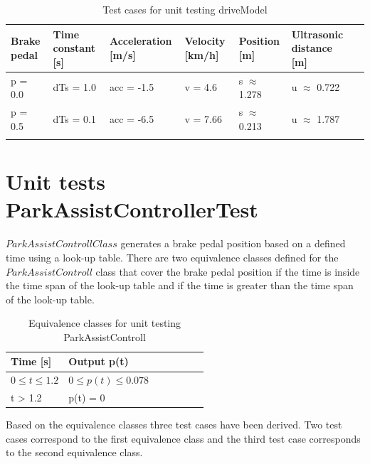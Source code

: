 \begin{table}[H]
\centering
\caption{Test cases for unit testing driveModel}
\begin{adjustbox}{width=1\textwidth, center=\textwidth}
\renewcommand{\arraystretch}{1}
\begin{tabular}{lllllll}
\textbf{Brake pedal} & \textbf{Time constant [s]} & \textbf{Acceleration [m/s]} &\textbf{Velocity [km/h]} & \textbf{Position [m]} & \textbf{Ultrasonic distance [m]} \\\hline
p = 0.0 & dTs = 1.0 & acc = -1.5 & v = 4.6 & s $\approx$ 1.278 & u $\approx$ 0.722\\
p = 0.5 & dTs = 0.1 & acc = -6.5 & v = 7.66 & s $\approx$ 0.213 & u $\approx$ 1.787\\
\label{tab:D10_drivemodel}
\end{tabular}
\end{adjustbox}
\end{table}

\section{Unit tests ParkAssistControllerTest}

$ParkAssistControllClass$ generates a brake pedal position based on a defined time using a look-up table.
There are two equivalence classes defined for the $ParkAssistControll$ class that cover the brake pedal position if the time is inside the time span of the look-up table and if the time is greater than the time span of the look-up table.

\begin{table}[H]
\centering
\caption{Equivalence classes for unit testing ParkAssistControll}
\begin{adjustbox}{width=0.5\textwidth, center=\textwidth}
\renewcommand{\arraystretch}{1}
\begin{tabular}{lllllll}
\textbf{Time [s]} & \textbf{Output p(t)} \\\hline
$0 \leq t \leq 1.2$ &$ 0 \leq p(t) \leq 0.078$ \\
t > 1.2 & p(t) = 0\\
\end{tabular}
\end{adjustbox}
\end{table}

Based on the equivalence classes three test cases have been derived. Two test cases correspond to the first equivalence class and the third test case corresponds to the second equivalence class. 

